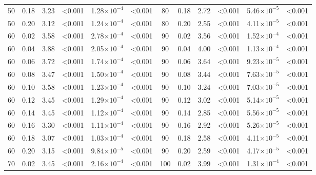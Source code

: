 \documentclass[12pt]{article}
\begin{document}
\begin{spacing}{2.0}
\begin{table}[h!]
\begin{tabular}{c c | c c| c c ||c c | c c | c c |}
	        50	&	0.18	&	3.23	&	\textless0.001	&	1.28$\times10^{-4}$	&	\textless0.001	&	80	&	0.18	&	2.72	&	\textless0.001	&	5.46$\times10^{-5}$	&	\textless0.001	\\
	        50	&	0.20	&	3.12	&	\textless0.001	&	1.24$\times10^{-4}$	&	\textless0.001	&	80	&	0.20	&	2.55	&	\textless0.001	&	4.11$\times10^{-5}$	&	\textless0.001	\\
	        60	&	0.02	&	3.58	&	\textless0.001	&	2.78$\times10^{-4}$	&	\textless0.001	&	90	&	0.02	&	3.56	&	\textless0.001	&	1.52$\times10^{-4}$	&	\textless0.001	\\
	        60	&	0.04	&	3.88	&	\textless0.001	&	2.05$\times10^{-4}$	&	\textless0.001	&	90	&	0.04	&	4.00	&	\textless0.001	&	1.13$\times10^{-4}$	&	\textless0.001	\\
	        60	&	0.06	&	3.72	&	\textless0.001	&	1.74$\times10^{-4}$	&	\textless0.001	&	90	&	0.06	&	3.64	&	\textless0.001	&	9.23$\times10^{-5}$	&	\textless0.001	\\
	        60	&	0.08	&	3.47	&	\textless0.001	&	1.50$\times10^{-4}$	&	\textless0.001	&	90	&	0.08	&	3.44	&	\textless0.001	&	7.63$\times10^{-5}$	&	\textless0.001	\\
	        60	&	0.10	&	3.58	&	\textless0.001	&	1.23$\times10^{-4}$	&	\textless0.001	&	90	&	0.10	&	3.24	&	\textless0.001	&	7.03$\times10^{-5}$	&	\textless0.001	\\
	        60	&	0.12	&	3.45	&	\textless0.001	&	1.29$\times10^{-4}$	&	\textless0.001	&	90	&	0.12	&	3.02	&	\textless0.001	&	5.14$\times10^{-5}$	&	\textless0.001	\\
	        60	&	0.14	&	3.45	&	\textless0.001	&	1.12$\times10^{-4}$	&	\textless0.001	&	90	&	0.14	&	2.85	&	\textless0.001	&	5.56$\times10^{-5}$	&	\textless0.001	\\
	        60	&	0.16	&	3.30	&	\textless0.001	&	1.11$\times10^{-4}$	&	\textless0.001	&	90	&	0.16	&	2.92	&	\textless0.001	&	5.26$\times10^{-5}$	&	\textless0.001	\\
	        60	&	0.18	&	3.07	&	\textless0.001	&	1.03$\times10^{-4}$	&	\textless0.001	&	90	&	0.18	&	2.58	&	\textless0.001	&	4.11$\times10^{-5}$	&	\textless0.001	\\
	        60	&	0.20	&	3.15	&	\textless0.001	&	9.84$\times10^{-5}$	&	\textless0.001	&	90	&	0.20	&	2.59	&	\textless0.001	&	4.17$\times10^{-5}$	&	\textless0.001	\\
	        70	&	0.02	&	3.45	&	\textless0.001	&	2.16$\times10^{-4}$	&	\textless0.001	&	100	&	0.02	&	3.99	&	\textless0.001	&	1.31$\times10^{-4}$	&	\textless0.001	\\

\end{tabular}
\end{table}
\end{spacing}
\end{document}
